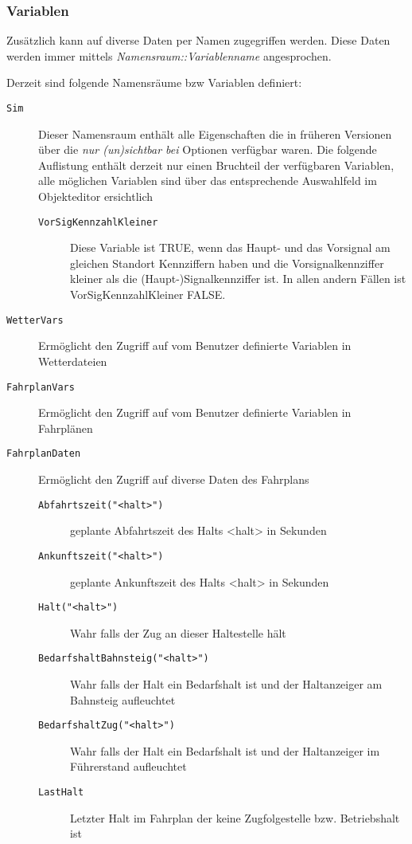 \subsubsection{Variablen}
\label{sec:editor-obj-logischeausdruecke-vars}

Zusätzlich kann auf diverse Daten per Namen zugegriffen werden. Diese
Daten werden immer mittels \emph{Namensraum::Variablenname}
angesprochen.

Derzeit sind folgende Namensräume bzw Variablen definiert:

\begin{description}
\item[\texttt{Sim}]
Dieser Namensraum enthält alle Eigenschaften die in früheren Versionen über die \emph{nur (un)sichtbar bei} Optionen verfügbar waren.
Die folgende Auflistung enthält derzeit nur einen Bruchteil der verfügbaren Variablen, alle möglichen Variablen sind über das entsprechende Auswahlfeld im Objekteditor ersichtlich
\begin{description}
\item[\texttt{VorSigKennzahlKleiner}]
Diese Variable ist TRUE, wenn das Haupt- und das Vorsignal am gleichen Standort Kennziffern haben und die Vorsignalkennziffer kleiner als die (Haupt-)Signalkennziffer ist. In allen andern Fällen ist VorSigKennzahlKleiner FALSE.
\end{description}


\item[\texttt{WetterVars}]
Ermöglicht den Zugriff auf vom Benutzer definierte Variablen in
Wetterdateien
\item[\texttt{FahrplanVars}]
Ermöglicht den Zugriff auf vom Benutzer definierte Variablen in
Fahrplänen
\item[\texttt{FahrplanDaten}]
Ermöglicht den Zugriff auf diverse Daten des Fahrplans

\begin{description}
\item[\texttt{Abfahrtszeit("\textless{}halt\textgreater{}")}]
geplante Abfahrtszeit des Halts \textless{}halt\textgreater{} in
Sekunden
\item[\texttt{Ankunftszeit("\textless{}halt\textgreater{}")}]
geplante Ankunftszeit des Halts \textless{}halt\textgreater{} in
Sekunden
\item[\texttt{Halt("\textless{}halt\textgreater{}")}]
Wahr falls der Zug an dieser Haltestelle hält
\item[\texttt{BedarfshaltBahnsteig("\textless{}halt\textgreater{}")}]
Wahr falls der Halt ein Bedarfshalt ist und der Haltanzeiger am Bahnsteig aufleuchtet
\item[\texttt{BedarfshaltZug("\textless{}halt\textgreater{}")}]
Wahr falls der Halt ein Bedarfshalt ist und der Haltanzeiger im Führerstand aufleuchtet
\item[\texttt{LastHalt}]
Letzter Halt im Fahrplan der keine Zugfolgestelle bzw. Betriebshalt ist
\end{description}


\end{description}
